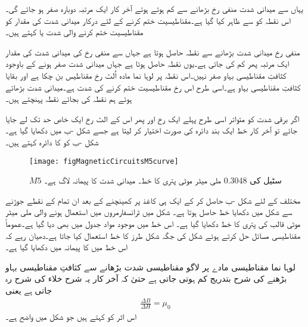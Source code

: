 یہاں سے میدانی شدت منفی رخ  بڑھانے سے   کم ہوتے ہوتے آخر کار ایک مرتبہ دوبارہ صفر ہو جائے گی۔اس نقطہ کو  سے ظاہر کیا گیا ہے۔مقناطیسیت ختم کرنے کے لئے درکار میدانی شدت کی مقدار   کو مقناطیسیت ختم کرنے والی شدت یا  کہتے ہیں۔

منفی رخ  میدانی شدت بڑھانے سے  نقطہ  حاصل ہوتا ہے جہاں سے منفی رخ  کی میدانی شدت کی مقدار ایک مرتبہ پھر کم کی جاتی ہے۔یوں نقطہ  حاصل ہوتا ہے جہاں میدانی شدت صفر ہونے کے باوجود کثافتِ مقناطیسی بہاو صفر نہیں۔اس نقطہ پر لوہا نما مادہ اُلٹ رخ مقناطیس بن چکا ہے اور  بقایا کثافتِ مقناطیسی بہاو ہے۔اسی طرح اس رخ مقناطیسیت ختم کرنے کی شدت  ہے۔میدانی شدت بڑھاتے ہوئے ہم نقطہ  کی بجائے نقطہ  پہنچتے ہیں۔

اگر برقی شدت کو متواتر اسی طرح پہلے ایک رخ اور پھر اس کے الٹ رخ  ایک خاص حد تک لے جایا جائے تو آخر کار   خط ایک بند دائرہ کی صورت  اختیار کر لیتا ہے جسے شکل -ب میں دکھایا گیا ہے۔شکل -ب کو   کا دائرہ  کہتے ہیں۔
\begin{figure}
\centering
\texttt{[image: figMagneticCircuitsM5curve]}
\caption{$M5$ سٹیل کی $0.3048$ ملی میٹر موٹی پتری کا خط۔ میدانی شدت کا پیمانہ لاگ ہے۔}
\label{شکل_مقناطیسی_ادوار_ایم_پانچ_پتری_کا_خط}
\end{figure}

مختلف  کے لئے  شکل -ب حاصل کر کے ایک ہی کاغذ پر کھینچنے کے بعد ان تمام کے   نقطے جوڑنے سے شکل  میں دکھایا  خط حاصل ہوتا ہے۔ شکل  میں ٹرانسفارمروں میں استعمال ہونے والی    ملی میٹر موٹی  قالب کی پتری کا  خط دکھایا گیا ہے۔ اس خط میں موجود مواد جدول   میں بھی دیا گیا ہے۔عموماً مقناطیسی مسائل حل کرتے ہوئے شکل  کی جگہ شکل  طرز  کا خط استعمال کیا جاتا ہے۔دھیان رہے کہ اس خط میں   کا پیمانہ  میں دکھایا گیا ہے۔

لوہا نما مقناطیسی مادے  پر لاگو مقناطیسی شدت بڑھانے سے کثافتِ مقناطیسی بہاو بڑھنے کی شرح بتدریج کم ہوتی جاتی ہے حتیٰ کہ آخر کار یہ شرح خلاء کی شرح   رہ جاتی ہے یعنی
\begin{align}
\frac{\Delta B}{\Delta H}=\mu_0
\end{align}
اس اثر کو  کہتے ہیں جو  شکل   میں واضح ہے۔

